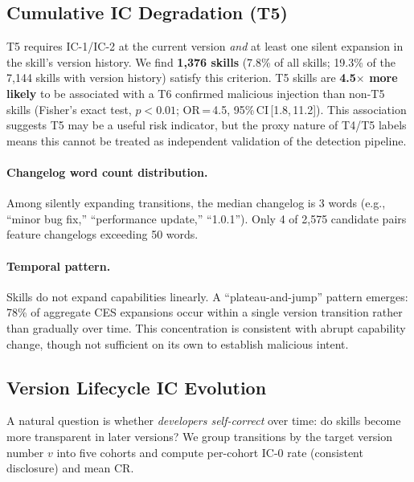 \subsection{Cumulative IC Degradation (T5)}

T5 requires IC-1/IC-2 at the current version
\emph{and} at least one silent expansion in the skill's version history.
We find \textbf{1,376 skills} (7.8\% of all \NskillsDMR{} skills;
19.3\% of the 7,144 skills with version history) satisfy this criterion.
T5 skills are \textbf{4.5$\times$ more likely} to be associated with
a T6 confirmed malicious injection than non-T5 skills
(Fisher's exact test, $p{<}0.01$; OR\,=\,4.5, 95\%\,CI\,[1.8,\,11.2]).
This association suggests T5 may be a useful risk indicator,
but the proxy nature of T4/T5 labels means this cannot be treated
as independent validation of the detection pipeline.

\paragraph{Changelog word count distribution.}
Among silently expanding transitions, the median changelog is 3 words
(e.g., ``minor bug fix,'' ``performance update,'' ``1.0.1'').
Only 4 of 2,575 candidate pairs feature changelogs exceeding 50 words.

\paragraph{Temporal pattern.}
Skills do not expand capabilities linearly.
A ``plateau-and-jump'' pattern emerges:
78\% of aggregate CES expansions occur within a single version transition
rather than gradually over time.
This concentration is consistent with abrupt capability change,
though not sufficient on its own to establish malicious intent.

\subsection{Version Lifecycle IC Evolution}
\label{sec:lifecycle}

A natural question is whether \emph{developers self-correct} over time:
do skills become more transparent in later versions?
We group transitions by the target version number $v$ into five cohorts
and compute per-cohort IC-0 rate (consistent disclosure) and mean CR.

